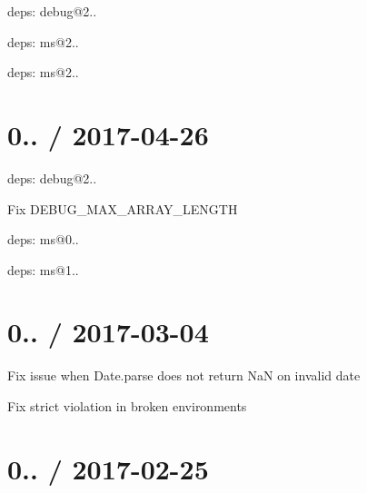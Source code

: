 
\begin{DoxyItemize}
\item deps\+: debug@2..
\begin{DoxyItemize}
\item deps\+: ms@2..
\end{DoxyItemize}
\item deps\+: ms@2..
\end{DoxyItemize}

\section*{0.. / 2017-\/04-\/26 }


\begin{DoxyItemize}
\item deps\+: debug@2..
\begin{DoxyItemize}
\item Fix {\ttfamily D\+E\+B\+U\+G\+\_\+\+M\+A\+X\+\_\+\+A\+R\+R\+A\+Y\+\_\+\+L\+E\+N\+G\+TH}
\item deps\+: ms@0..
\end{DoxyItemize}
\item deps\+: ms@1..
\end{DoxyItemize}

\section*{0.. / 2017-\/03-\/04 }


\begin{DoxyItemize}
\item Fix issue when {\ttfamily Date.\+parse} does not return {\ttfamily NaN} on invalid date
\item Fix strict violation in broken environments
\end{DoxyItemize}

\section*{0.. / 2017-\/02-\/25 }


